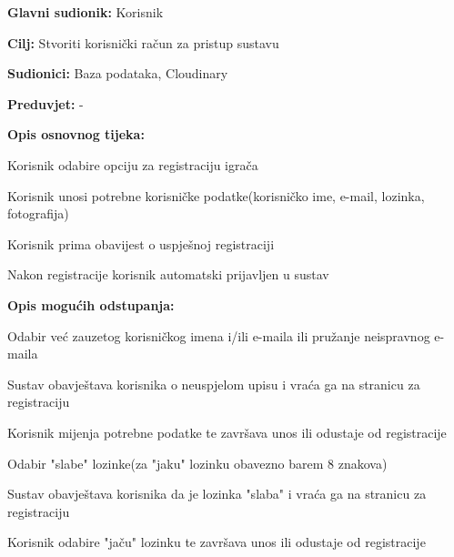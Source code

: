 					
					\noindent {}
					\begin{packed_item}
	
						\item \textbf{Glavni sudionik: }Korisnik
						\item  \textbf{Cilj:} Stvoriti korisnički račun za pristup sustavu
						\item  \textbf{Sudionici:} Baza podataka, Cloudinary
						\item  \textbf{Preduvjet:} -
						\item  \textbf{Opis osnovnog tijeka:}
						
						\item[] \begin{packed_enum}
	
							\item Korisnik odabire opciju za registraciju igrača
							\item Korisnik unosi potrebne korisničke podatke(korisničko ime, e-mail, lozinka, fotografija)
							\item Korisnik prima obavijest o uspješnoj registraciji
							\item Nakon registracije korisnik automatski prijavljen u sustav
						\end{packed_enum}
						
						\item  \textbf{Opis mogućih odstupanja:}
						
						\item[] \begin{packed_item}
	
							\item Odabir već zauzetog korisničkog imena i/ili e-maila ili pružanje neispravnog e-maila
							\item[] \begin{packed_enum}
								
								\item Sustav obavještava korisnika o neuspjelom upisu i vraća ga na stranicu za registraciju 
								\item Korisnik mijenja potrebne podatke te završava unos ili odustaje od registracije
								
							\end{packed_enum}
							\item Odabir "slabe" lozinke(za "jaku" lozinku obavezno barem 8 znakova)
							\item[] \begin{packed_enum}
								\item Sustav obavještava korisnika da je lozinka "slaba" i vraća ga na stranicu za registraciju
								\item Korisnik odabire "jaču" lozinku te završava unos ili odustaje od registracije 
								
							\end{packed_enum}
								
						\end{packed_item}
					\end{packed_item}
				

